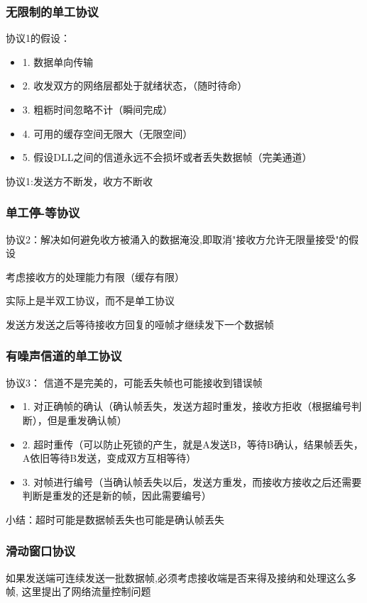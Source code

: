 \documentclass[UTF8,a4paper]{ctexart}
\begin{document}
  \subsubsection{无限制的单工协议}
  协议1的假设：
  \begin{itemize}
    \item 1. 数据单向传输
    \item 2. 收发双方的网络层都处于就绪状态，（随时待命）
    \item 3. 粗粝时间忽略不计（瞬间完成）
    \item 4. 可用的缓存空间无限大（无限空间）
    \item 5. 假设DLL之间的信道永远不会损坏或者丢失数据帧（完美通道）
  \end{itemize}

  协议1:发送方不断发，收方不断收
  \subsubsection{单工停-等协议}
  协议2：解决如何避免收方被涌入的数据淹没,即取消"接收方允许无限量接受"的假设

  考虑接收方的处理能力有限（缓存有限）

  实际上是半双工协议，而不是单工协议

  发送方发送之后等待接收方回复的哑帧才继续发下一个数据帧

  \subsubsection{有噪声信道的单工协议}
  协议3：
  信道不是完美的，可能丢失帧也可能接收到错误帧
  \begin{itemize}
    \item 1. 对正确帧的确认（确认帧丢失，发送方超时重发，接收方拒收（根据编号判断），但是重发确认帧）
    \item 2. 超时重传（可以防止死锁的产生，就是A发送B，等待B确认，结果帧丢失，A依旧等待B发送，变成双方互相等待）
    \item 3. 对帧进行编号（当确认帧丢失以后，发送方重发，而接收方接收之后还需要判断是重发的还是新的帧，因此需要编号）
  \end{itemize}

  小结：超时可能是数据帧丢失也可能是确认帧丢失

\subsubsection{滑动窗口协议}
如果发送端可连续发送一批数据帧,必须考虑接收端是否来得及接纳和处理这么多帧, 这里提出了网络流量控制问题
\end{document}
